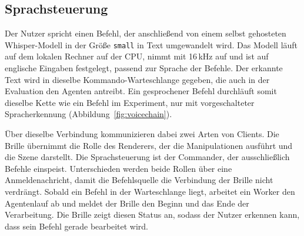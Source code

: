 \subsection*{Sprachsteuerung}

Der Nutzer spricht einen Befehl, der anschließend von einem selbst gehosteten Whisper-Modell in der Größe \texttt{small} in Text umgewandelt wird.
Das Modell läuft auf dem lokalen Rechner auf der CPU, nimmt mit 16\,kHz auf und ist auf englische Eingaben festgelegt, passend zur Sprache der Befehle.
Der erkannte Text wird in dieselbe Kommando-Warteschlange gegeben, die auch in der Evaluation den Agenten antreibt.
Ein gesprochener Befehl durchläuft somit dieselbe Kette wie ein Befehl im Experiment, nur mit vorgeschalteter Spracherkennung (Abbildung~\ref{fig:voicechain}).

Über dieselbe Verbindung kommunizieren dabei zwei Arten von Clients.
Die Brille übernimmt die Rolle des Renderers, der die Manipulationen ausführt und die Szene darstellt.
Die Sprachsteuerung ist der Commander, der ausschließlich Befehle einspeist.
Unterschieden werden beide Rollen über eine Anmeldenachricht, damit die Befehlsquelle die Verbindung der Brille nicht verdrängt.
Sobald ein Befehl in der Warteschlange liegt, arbeitet ein Worker den Agentenlauf ab und meldet der Brille den Beginn und das Ende der Verarbeitung.
Die Brille zeigt diesen Status an, sodass der Nutzer erkennen kann, dass sein Befehl gerade bearbeitet wird.

